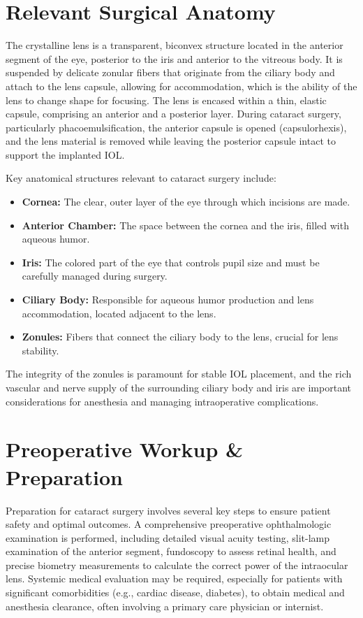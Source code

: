 \section*{Relevant Surgical Anatomy}
The crystalline lens is a transparent, biconvex structure located in the anterior segment of the eye, posterior to the iris and anterior to the vitreous body. It is suspended by delicate zonular fibers that originate from the ciliary body and attach to the lens capsule, allowing for accommodation, which is the ability of the lens to change shape for focusing. The lens is encased within a thin, elastic capsule, comprising an anterior and a posterior layer. During cataract surgery, particularly phacoemulsification, the anterior capsule is opened (capsulorhexis), and the lens material is removed while leaving the posterior capsule intact to support the implanted IOL.

Key anatomical structures relevant to cataract surgery include:

\begin{itemize}
  \item \textbf{Cornea:} The clear, outer layer of the eye through which incisions are made.
  \item \textbf{Anterior Chamber:} The space between the cornea and the iris, filled with aqueous humor.
  \item \textbf{Iris:} The colored part of the eye that controls pupil size and must be carefully managed during surgery.
  \item \textbf{Ciliary Body:} Responsible for aqueous humor production and lens accommodation, located adjacent to the lens.
  \item \textbf{Zonules:} Fibers that connect the ciliary body to the lens, crucial for lens stability.
\end{itemize}

The integrity of the zonules is paramount for stable IOL placement, and the rich vascular and nerve supply of the surrounding ciliary body and iris are important considerations for anesthesia and managing intraoperative complications.

\section*{Preoperative Workup \& Preparation}
Preparation for cataract surgery involves several key steps to ensure patient safety and optimal outcomes. A comprehensive preoperative ophthalmologic examination is performed, including detailed visual acuity testing, slit-lamp examination of the anterior segment, fundoscopy to assess retinal health, and precise biometry measurements to calculate the correct power of the intraocular lens. Systemic medical evaluation may be required, especially for patients with significant comorbidities (e.g., cardiac disease, diabetes), to obtain medical and anesthesia clearance, often involving a primary care physician or internist.

